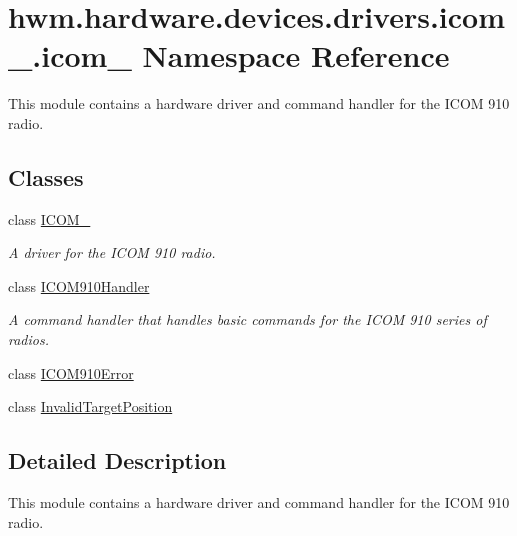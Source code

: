 \hypertarget{namespacehwm_1_1hardware_1_1devices_1_1drivers_1_1icom__910_1_1icom__910}{\section{hwm.\-hardware.\-devices.\-drivers.\-icom\-\_.\-icom\-\_ Namespace Reference}
\label{namespacehwm_1_1hardware_1_1devices_1_1drivers_1_1icom__910_1_1icom__910}
}


This module contains a hardware driver and command handler for the I\-C\-O\-M 910 radio.  


\subsection*{Classes}
\begin{DoxyCompactItemize}
\item 
class \hyperlink{classhwm_1_1hardware_1_1devices_1_1drivers_1_1icom__910_1_1icom__910_1_1_i_c_o_m__910}{I\-C\-O\-M\-\_}
\begin{DoxyCompactList}\small\item\em A driver for the I\-C\-O\-M 910 radio. \end{DoxyCompactList}\item 
class \hyperlink{classhwm_1_1hardware_1_1devices_1_1drivers_1_1icom__910_1_1icom__910_1_1_i_c_o_m910_handler}{I\-C\-O\-M910\-Handler}
\begin{DoxyCompactList}\small\item\em A command handler that handles basic commands for the I\-C\-O\-M 910 series of radios. \end{DoxyCompactList}\item 
class \hyperlink{classhwm_1_1hardware_1_1devices_1_1drivers_1_1icom__910_1_1icom__910_1_1_i_c_o_m910_error}{I\-C\-O\-M910\-Error}
\item 
class \hyperlink{classhwm_1_1hardware_1_1devices_1_1drivers_1_1icom__910_1_1icom__910_1_1_invalid_target_position}{Invalid\-Target\-Position}
\end{DoxyCompactItemize}


\subsection{Detailed Description}
This module contains a hardware driver and command handler for the I\-C\-O\-M 910 radio. 